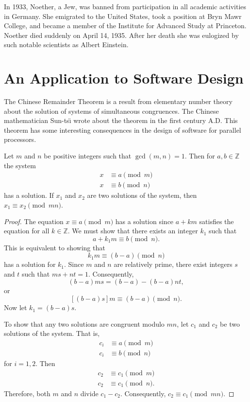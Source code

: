 { 
In 1933, Noether, a Jew, was banned from participation in all academic
activities in Germany. She emigrated to the United States, took a
position at Bryn Mawr College, and became a member of the Institute
for Advanced Study at Princeton. Noether died suddenly on April 14,
1935. After her death she was eulogized by such notable
scientists as Albert Einstein. 
\histbox
} 
 
 
 
\section{An Application to Software Design}
 
 
The Chinese Remainder Theorem is a result from elementary number
theory about the solution of systems of simultaneous congruences. The 
Chinese mathematician Sun-ts\"{\i} wrote about the theorem in the
first century A.D\@. This theorem has some interesting
consequences in the design of software for parallel processors.
 
 
\begin{lemma}\label{rings:chinese_remainder_lemma}
Let $m$ and $n$ be positive integers such that $\gcd( m, n) = 1$. Then
for $a, b \in {\mathbb Z}$ the system
\begin{align*}
x & \equiv  a \pmod{m} \\
x & \equiv  b \pmod{n} 
\end{align*}
has a solution.  If $x_1$ and $x_2$ are two solutions of the system,
then  $x_1 \equiv x_2 \pmod{mn}$.
\end{lemma}
 
 
\begin{proof}
The equation $x \equiv a \pmod{m}$ has a solution since $a +km$
satisfies the equation for all $k \in {\mathbb Z}$.  We must show that
there exists an integer $k_1$ such that 
\[
a + k_1 m \equiv b \pmod{n}.
\] 
This is equivalent to showing that 
\[
k_1 m \equiv (b-a) \pmod{n}
\] 
has a solution for $k_1$.  Since $m$ and $n$ are relatively prime,
there exist integers $s$ and $t$ such that $ms + nt = 1$.
Consequently, 
\[
(b-a) ms = (b-a) -(b-a) nt,
\]
or 
\[
[(b-a)s]m \equiv (b-a) \pmod{n}. 
\]
Now let $k_1 = (b-a)s$.
 
 
To show that any two solutions are congruent modulo $mn$, let $c_1$ and
$c_2$ be two solutions of  the system. That is,
\begin{align*}
c_i & \equiv  a \pmod{m} \\
c_i & \equiv  b \pmod{n} 
\end{align*}
for $i = 1, 2$. Then
\begin{align*}
c_2 & \equiv  c_1 \pmod{m} \\
c_2 & \equiv  c_1 \pmod{n}. 
\end{align*}
Therefore, both $m$ and $n$ divide $c_1 - c_2$. Consequently,
$c_2 \equiv c_1 \pmod{mn}$.
\mbox{\hspace*{1in}}  
\end{proof}
 
